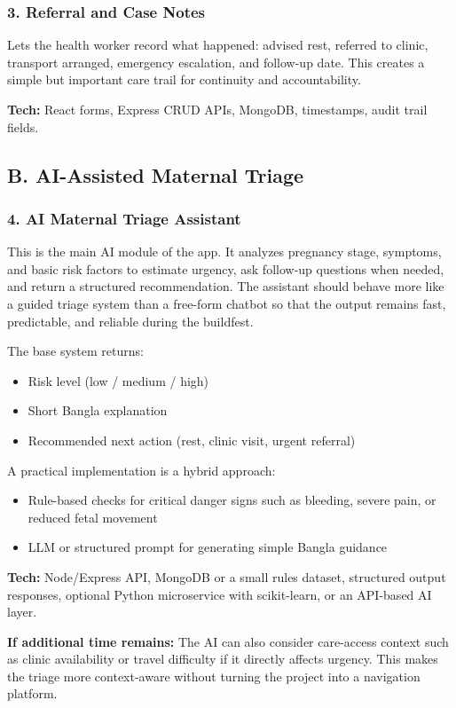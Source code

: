 \documentclass[11pt]{article}
\begin{document}
\subsubsection{3. Referral and Case Notes}
Lets the health worker record what happened: advised rest, referred to clinic, transport arranged, emergency escalation, and follow-up date. This creates a simple but important care trail for continuity and accountability.

\textbf{Tech:} React forms, Express CRUD APIs, MongoDB, timestamps, audit trail fields.

\subsection{B. AI-Assisted Maternal Triage}

\subsubsection{4. AI Maternal Triage Assistant}
This is the main AI module of the app. It analyzes pregnancy stage, symptoms, and basic risk factors to estimate urgency, ask follow-up questions when needed, and return a structured recommendation. The assistant should behave more like a guided triage system than a free-form chatbot so that the output remains fast, predictable, and reliable during the buildfest.

The base system returns:
\begin{itemize}
    \item Risk level (low / medium / high)
    \item Short Bangla explanation
    \item Recommended next action (rest, clinic visit, urgent referral)
\end{itemize}

A practical implementation is a hybrid approach:
\begin{itemize}
    \item Rule-based checks for critical danger signs such as bleeding, severe pain, or reduced fetal movement
    \item LLM or structured prompt for generating simple Bangla guidance
\end{itemize}

\textbf{Tech:} Node/Express API, MongoDB or a small rules dataset, structured output responses, optional Python microservice with scikit-learn, or an API-based AI layer.

\textbf{If additional time remains:}  
The AI can also consider care-access context such as clinic availability or travel difficulty if it directly affects urgency. This makes the triage more context-aware without turning the project into a navigation platform.
\end{document}
